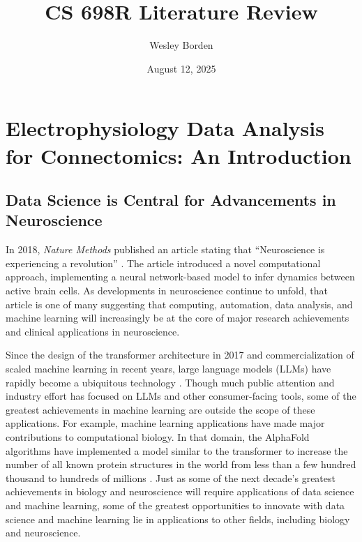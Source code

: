 \documentclass[11pt]{article}
\title{CS 698R Literature Review}
\author{Wesley Borden}
\date{August 12, 2025}
\newcommand{\sectionwithindent}[1]{
    \section*{#1}
    \hspace{\parindent} %
}
\newcommand{\subsectionwithindent}[1]{
    \subsection*{#1}
    \hspace{\parindent} %
}
\begin{document}
\sectionwithindent{Electrophysiology Data Analysis for Connectomics: An Introduction}

\vspace{-2em}

\subsectionwithindent{Data Science is Central for Advancements in Neuroscience}
In 2018, \textit{Nature Methods} published an article stating that ``Neuroscience is experiencing a revolution'' \cite{pandarinath2018autoencoders}. The article introduced a novel computational approach, implementing a neural network-based model to infer dynamics between active brain cells. As developments in neuroscience continue to unfold, that article is one of many suggesting that computing, automation, data analysis, and machine learning will increasingly be at the core of major research achievements and clinical applications in neuroscience.

Since the design of the transformer architecture in 2017 \cite{vaswani2023attentionneed} and commercialization of scaled machine learning in recent years, large language models (LLMs) have rapidly become a ubiquitous technology \cite{naveed2025llm}. Though much public attention and industry effort has focused on LLMs and other consumer-facing tools, some of the greatest achievements in machine learning are outside the scope of these applications. For example, machine learning applications have made major contributions to computational biology. In that domain, the AlphaFold algorithms have implemented a model similar to the transformer to increase the number of all known protein structures in the world from less than a few hundred thousand to hundreds of millions \cite{jumper2021alphafold, varadi2024alphafolddb}. Just as some of the next decade's greatest achievements in biology and neuroscience will require applications of data science and machine learning, some of the greatest opportunities to innovate with data science and machine learning lie in applications to other fields, including biology and neuroscience.
\end{document}
